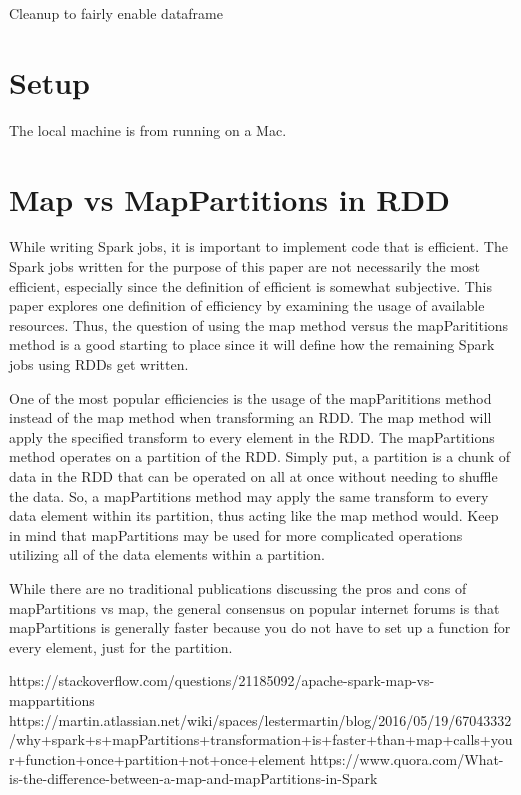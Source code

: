 \documentclass[conference]{IEEEtran}
\begin{document}
Cleanup to fairly enable dataframe


\section{Setup}
The local machine is from running on a Mac.

\section{Map vs MapPartitions in RDD}
While writing Spark jobs, it is important to implement code that is efficient.
The Spark jobs written for the purpose of this paper are not necessarily the most efficient, especially since the definition of efficient is somewhat subjective.
This paper explores one definition of efficiency by examining the usage of available resources.
Thus, the question of using the map method versus the mapParititions method is a good starting to place since it will define how the remaining Spark jobs using RDDs get written.

One of the most popular efficiencies is the usage of the mapParititions method instead of the map method when transforming an RDD.
The map method will apply the specified transform to every element in the RDD.
The mapPartitions method operates on a partition of the RDD.
Simply put, a partition is a chunk of data in the RDD that can be operated on all at once without needing to shuffle the data.
So, a mapPartitions method may apply the same transform to every data element within its partition, thus acting like the map method would.
Keep in mind that mapPartitions may be used for more complicated operations utilizing all of the data elements within a partition.

While there are no traditional publications discussing the pros and cons of mapPartitions vs map, the general consensus on popular internet forums is that mapPartitions is generally faster because you do not have to set up a function for every element, just for the partition.

https://stackoverflow.com/questions/21185092/apache-spark-map-vs-mappartitions
https://martin.atlassian.net/wiki/spaces/lestermartin/blog/2016/05/19/67043332/why+spark+s+mapPartitions+transformation+is+faster+than+map+calls+your+function+once+partition+not+once+element
https://www.quora.com/What-is-the-difference-between-a-map-and-mapPartitions-in-Spark
\end{document}
